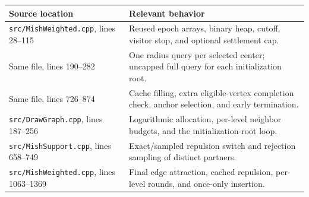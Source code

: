 \documentclass[11pt,a4paper]{article}
\begin{document}
\begin{center}
\small
\begin{tabularx}{\textwidth}{@{}p{}X@{}}
\toprule
Source location & Relevant behavior \\
\midrule
\nolinkurl{src/MishWeighted.cpp}, lines 28--115
& Reused epoch arrays, binary heap, cutoff, visitor stop, and optional settlement cap. \\
\addlinespace
Same file, lines 190--282
& One radius query per selected center; uncapped full query for each initialization root. \\
\addlinespace
Same file, lines 726--874
& Cache filling, extra eligible-vertex completion check, anchor selection, and early termination. \\
\addlinespace
\nolinkurl{src/DrawGraph.cpp}, lines 187--256
& Logarithmic allocation, per-level neighbor budgets, and the initialization-root loop. \\
\addlinespace
\nolinkurl{src/MishSupport.cpp}, lines 658--749
& Exact/sampled repulsion switch and rejection sampling of distinct partners. \\
\addlinespace
\nolinkurl{src/MishWeighted.cpp}, lines 1063--1369
& Final edge attraction, cached repulsion, per-level rounds, and once-only insertion. \\
\bottomrule
\end{tabularx}
\end{center}



\end{document}
